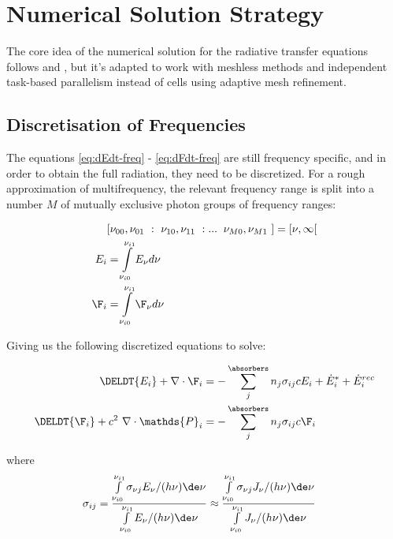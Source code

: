 \section{Numerical Solution Strategy}


The core idea of the numerical solution for the radiative transfer equations
follows \cite{ramses-rt13} and \cite{ramses-rt15}, but it's adapted to work
with meshless methods and independent task-based parallelism instead of cells
using adaptive mesh refinement.







\subsection{Discretisation of Frequencies}



The equations \ref{eq:dEdt-freq} - \ref{eq:dFdt-freq} are still frequency specific,
and in order to obtain the full radiation, they need to be discretized.
For a rough approximation of multifrequency, the relevant frequency range is
split into a number $M$ of mutually exclusive photon groups of frequency ranges:

\begin{align}
	& [\nu_{00}, \nu_{01}\ :\ \nu_{10}, \nu_{11}\ : ... \: \ \nu_{M0}, \nu_{M1}\ ] = [\nu_{}, \infty [ \\
	E_i &= \int\limits_{\nu_{i0}}^{\nu_{i1}} E_\nu d\nu \\
	\F_i &= \int\limits_{\nu_{i0}}^{\nu_{i1}} \F_\nu d\nu
\end{align}


Giving us the following discretized equations to solve:


\begin{align}
	\DELDT{E_i} + \nabla \cdot \F_i &=
		- \sum\limits_{j}^{\absorbers} n_j \sigma_{i j} c E_i + \dot{E}_i^* + \dot{E}_i ^{rec}
		\label{eq:dEdt-group} \\
	\DELDT{\F_i} + c^2 \ \nabla \cdot \mathds{P}_i &=
		- \sum\limits_{j}^{\absorbers} n_j \sigma_{i j} c \F_i
		\label{eq:dFdt-group}
\end{align}


where
\begin{align}
	\sigma_{ij}
        &= \frac{
                \int\limits_{\nu_{i0}}^{\nu_{i1}} \sigma_{\nu j} E_\nu / (h \nu) \de \nu
            } {
                \int\limits_{\nu_{i0}}^{\nu_{i1}} E_\nu / (h \nu) \de \nu
            }
		\approx \frac{
            \int\limits_{\nu_{i0}}^{\nu_{i1}} \sigma_{\nu j} J_\nu / (h \nu) \de \nu
            }{
                \int\limits_{\nu_{i0}}^{\nu_{i1}} J_\nu / (h \nu) \de \nu
            }
\end{align}

